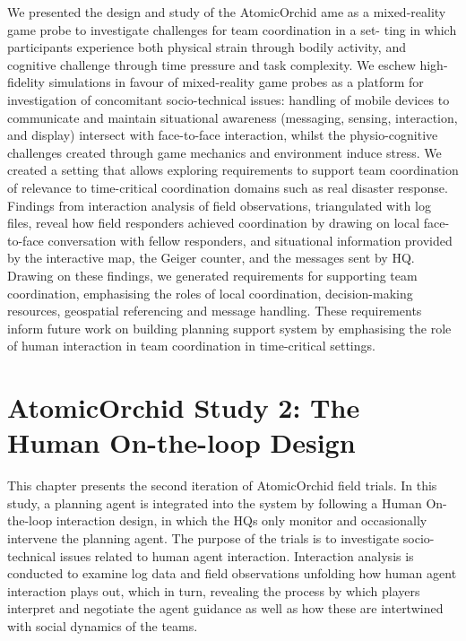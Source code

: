 We presented the design and study of the AtomicOrchid ame as a mixed-reality game probe to investigate challenges for team coordination in a set- ting in which participants experience both physical strain through bodily activity, and cognitive challenge through time pressure and task complexity. We eschew high-fidelity simulations in favour of mixed-reality game probes as a platform for investigation of concomitant socio-technical issues: handling of mobile devices to communicate and maintain situational awareness (messaging, sensing, interaction, and display) intersect with face-to-face interaction, whilst the physio-cognitive challenges created through game mechanics and environment induce stress. We created a setting that allows exploring requirements to support team coordination of relevance to time-critical coordination domains such as real disaster response.\\

Findings from interaction analysis of field observations, triangulated with log files, reveal how field responders achieved coordination by drawing on local face-to-face conversation with fellow responders, and situational information provided by the interactive map, the Geiger counter, and the messages sent by HQ. Drawing on these findings, we generated requirements for supporting team coordination, emphasising the roles of local coordination, decision-making resources, geospatial referencing and message handling. These requirements inform future work on building planning support system by emphasising the role of human interaction in team coordination in time-critical settings.\\

\chapter{AtomicOrchid Study 2: The Human On-the-loop Design}\label{ch:studytwo} %
This chapter presents the second iteration of AtomicOrchid field trials. In this study, a planning agent is integrated into the system by following a Human On-the-loop interaction design, in which the HQs only monitor and occasionally intervene the planning agent. The purpose of the trials is to investigate socio-technical issues related to human agent interaction. Interaction analysis is conducted to examine log data and field observations unfolding how human agent interaction plays out, which in turn, revealing the process by which players interpret and negotiate the agent guidance as well as how these are intertwined with social dynamics of the teams.

